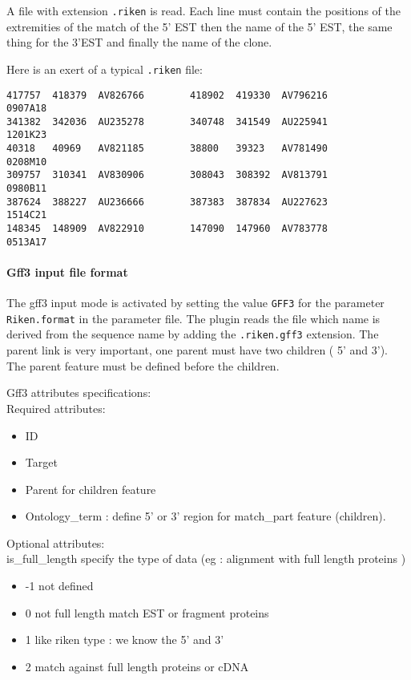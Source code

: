 A file with extension \texttt{.riken} is read.  Each line must contain
the positions of the extremities of the match of the 5' EST then the
name of the 5' EST, the same thing for the 3'EST and finally the name
of the clone.

Here is an exert of a typical \texttt{.riken} file:
\begin{Verbatim}[fontsize=\small]
417757  418379  AV826766        418902  419330  AV796216        0907A18
341382  342036  AU235278        340748  341549  AU225941        1201K23
40318   40969   AV821185        38800   39323   AV781490        0208M10
309757  310341  AV830906        308043  308392  AV813791        0980B11
387624  388227  AU236666        387383  387834  AU227623        1514C21
148345  148909  AV822910        147090  147960  AV783778        0513A17
\end{Verbatim}

\paragraph{Gff3 input file format}
The gff3 input mode is activated by setting the value \texttt{GFF3}
for the parameter \texttt{Riken.format} in the parameter file.  The
plugin reads the file which name is derived from the sequence name by
adding the \texttt{.riken.gff3} extension. The parent link is very
important, one parent must have two children ( 5' and 3'). The parent
feature must be defined before the children.

Gff3 attributes specifications:\\
Required attributes:\\ 
	\begin{itemize}
	\item ID
	\item Target
	\item Parent for children feature
	\item Ontology\_term : define 5' or 3' region for match\_part feature (children).
	\end{itemize}

Optional attributes:\\ 
	is\_full\_length specify the type of data (eg : alignment with full length proteins )
	\begin{itemize}
	\item -1 not defined
	\item 0  not full length match EST or fragment proteins 
	\item 1  like riken type : we know the 5' and 3'
	\item 2  match against full length proteins or cDNA
	\end{itemize}

